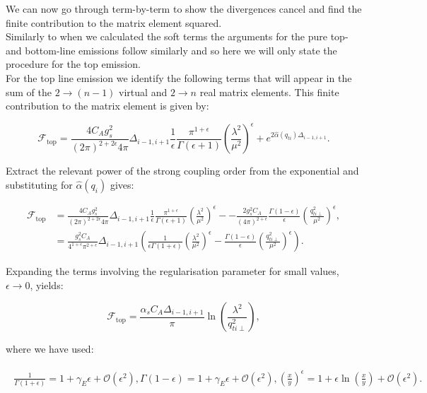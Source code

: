 		We can now go through term-by-term to show the divergences cancel and find the finite contribution to
		the matrix element squared.\\Similarly to when we calculated the soft terms the arguments for the pure
		top- and bottom-line emissions follow similarly and so here we will only state the procedure for
		the top emission.\\For the top line emission we identify the following terms that will appear in the
		sum of the $2\rightarrow (n-1)$ virtual and $2\rightarrow n$ real matrix elements.  This finite
		contribution to the matrix element is given by:

		\begin{equation}
			\mathcal{F}_{\text{top}} = \frac{4C_Ag_s^2}{(2\pi)^{2+2\epsilon}4\pi}\Delta_{i-1, i+1}
			\frac{1}{\epsilon}\frac{\pi^{1+\epsilon}}
			{\Gamma(\epsilon+1)}\left(\frac{\lambda^2}{\mu^2}\right)^\epsilon +
			e^{2\hat{\alpha}(q_{ti})\Delta_{i-1,i+1}}.
		\end{equation}

		Extract the relevant power of the strong coupling order from the
		exponential and substituting for $\hat{\alpha}(q_i)$ gives:

		\begin{align}
			\mathcal{F}_{\text{top}} &= \frac{4C_Ag_s^2}{(2\pi)^{2+2\epsilon}4\pi}\Delta_{i-1, i+1}\frac{1}{\epsilon}\frac{\pi^{1+\epsilon}}
			{\Gamma(\epsilon+1)}\left(\frac{\lambda^2}{\mu^2}\right)^\epsilon - -\frac{2g_s^2C_A}{(4\pi)^{2+\epsilon}}
			\frac{\Gamma(1-\epsilon)}{\epsilon}\left(\frac{q_{ti\perp}^2}{\mu^2}\right)^\epsilon, \\
			&= \frac{g_s^2C_A}{4^{1+\epsilon}\pi^{2+\epsilon}}\Delta_{i-1, i+1}\left(\frac{1}{\epsilon\Gamma(1+\epsilon)}
			\left(\frac{\lambda^2}{\mu^2}\right)^\epsilon - \frac{\Gamma(1-\epsilon)}{\epsilon}
			\left(\frac{q_{ti\perp}^2}{\mu^2}\right)^\epsilon\right).
		\end{align}

		Expanding the terms involving the regularisation parameter for small values,
		$\epsilon\to0$, yields:

		\begin{equation}
			\mathcal{F}_{\text{top}} = \frac{\alpha_sC_A\Delta_{i-1, i+1}}{\pi}
			\ln\left(\frac{\lambda^2}{q_{ti\perp}^2}\right),
		\end{equation}

		where we have used:

		\begin{align}
		\begin{split}
			\frac{1}{\Gamma(1+\epsilon)} = 1 + \gamma_E\epsilon + \mathcal{O}(\epsilon^2),
			\Gamma(1-\epsilon) = 1 + \gamma_E\epsilon + \mathcal{O}(\epsilon^2),
			\left(\frac{x}{y}\right)^\epsilon = 1 + \epsilon\ln\left(\frac{x}{y}\right) +
			\mathcal{O}(\epsilon^2).
		\end{split}
		\end{align}


